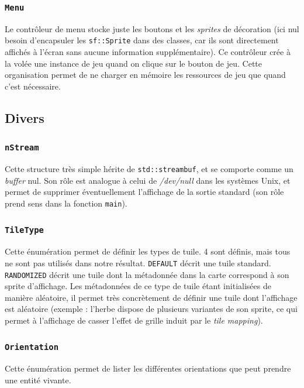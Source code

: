 \documentclass[a4paper,10pt]{report}
\begin{document}
\subsubsection{\texttt{Menu}}

Le contrôleur de menu stocke juste les boutons et les \textit{sprites} de décoration (ici nul besoin d'encapsuler les \texttt{sf::Sprite} dans des classes, car ils sont directement affichés à l'écran sans aucune information supplémentaire). Ce contrôleur crée à la volée une instance de jeu quand on clique sur le bouton de jeu. Cette organisation permet de ne charger en mémoire les ressources de jeu que quand c'est nécessaire.

\subsection{Divers}
\subsubsection{\texttt{nStream}}

Cette structure très simple hérite de \texttt{std::streambuf}, et se comporte comme un \textit{buffer} nul. Son rôle est analogue à celui de \textit{/dev/null} dans les systèmes Unix, et permet de supprimer éventuellement l'affichage de la sortie standard (son rôle prend sens dans la fonction \texttt{main}).
\subsubsection{\texttt{TileType}}

Cette énumération permet de définir les types de tuile. 4 sont définis, mais tous ne sont pas utilisés dans notre résultat. \texttt{DEFAULT} décrit une tuile standard. \texttt{RANDOMIZED} décrit une tuile dont la métadonnée dans la carte correspond à son sprite d'affichage. Les métadonnées de ce type de tuile étant initialisées de manière aléatoire, il permet très concrètement de définir une tuile dont l'affichage est aléatoire (exemple : l'herbe dispose de plusieurs variantes de son sprite, ce qui permet à l'affichage de casser l'effet de grille induit par le \textit{tile mapping}).
\subsubsection{\texttt{Orientation}}

Cette énumération permet de lister les différentes orientations que peut prendre une entité vivante.
\end{document}
